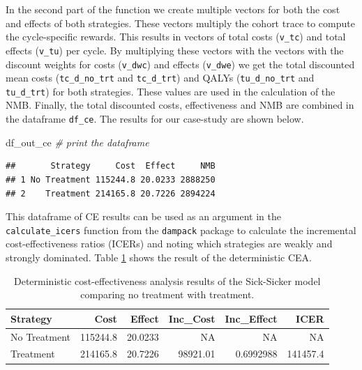 \documentclass[]{book}
\newenvironment{Shaded}{\begin{snugshade}}{\end{snugshade}}
\newcommand{\KeywordTok}[1]{\textcolor[rgb]{0.13,0.29,0.53}{\textbf{#1}}}
\newcommand{\DataTypeTok}[1]{\textcolor[rgb]{0.13,0.29,0.53}{#1}}
\newcommand{\StringTok}[1]{\textcolor[rgb]{0.31,0.60,0.02}{#1}}
\newcommand{\CommentTok}[1]{\textcolor[rgb]{0.56,0.35,0.01}{\textit{#1}}}
\newcommand{\OperatorTok}[1]{\textcolor[rgb]{0.81,0.36,0.00}{\textbf{#1}}}
\newcommand{\NormalTok}[1]{#1}
\begin{document}
In the second part of the function we create multiple vectors for both
the cost and effects of both strategies. These vectors multiply the
cohort trace to compute the cycle-specific rewards. This results in
vectors of total costs (\texttt{v\_tc}) and total effects
(\texttt{v\_tu}) per cycle. By multiplying these vectors with the
vectors with the discount weights for costs (\texttt{v\_dwc}) and
effects (\texttt{v\_dwe}) we get the total discounted mean costs
(\texttt{tc\_d\_no\_trt} and \texttt{tc\_d\_trt}) and QALYs
(\texttt{tu\_d\_no\_trt} and \texttt{tu\_d\_trt}) for both strategies.
These values are used in the calculation of the NMB. Finally, the total
discounted costs, effectiveness and NMB are combined in the dataframe
\texttt{df\_ce}. The results for our case-study are shown below.

\begin{Shaded}
\begin{Highlighting}[]
\NormalTok{df_out_ce }\CommentTok{# print the dataframe }
\end{Highlighting}
\end{Shaded}

\begin{verbatim}
##       Strategy     Cost  Effect     NMB
## 1 No Treatment 115244.8 20.0233 2888250
## 2    Treatment 214165.8 20.7226 2894224
\end{verbatim}

This dataframe of CE results can be used as an argument in the
\texttt{calculate\_icers} function from the \texttt{dampack} package to
calculate the incremental cost-effectiveness ratios (ICERs) and noting
which strategies are weakly and strongly dominated. Table
\ref{tab:df-cea-det} shows the result of the deterministic CEA.

\begin{Shaded}
\end{Shaded}

\begin{table}[!h]

\caption{\label{tab:df-cea-det}Deterministic cost-effectiveness analysis results of the Sick-Sicker model comparing no treatment with treatment.}
\centering
\begin{tabular}{l|r|r|r|r|r}
\hline
Strategy & Cost & Effect & Inc\_Cost & Inc\_Effect & ICER\\
\hline
No Treatment & 115244.8 & 20.0233 & NA & NA & NA\\
\hline
Treatment & 214165.8 & 20.7226 & 98921.01 & 0.6992988 & 141457.4\\
\hline
\end{tabular}
\end{table}
\end{document}
